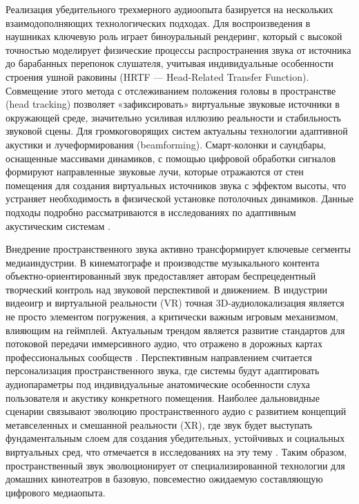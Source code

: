\documentclass{SibFU-docs}
\begin{document}

Реализация убедительного трехмерного аудиоопыта базируется на нескольких взаимодополняющих технологических подходах. Для воспроизведения в наушниках ключевую роль играет биноуральный рендеринг, который с высокой точностью моделирует физические процессы распространения звука от источника до барабанных перепонок слушателя, учитывая индивидуальные особенности строения ушной раковины (HRTF — Head-Related Transfer Function). Совмещение этого метода с отслеживанием положения головы в пространстве (head tracking) позволяет «зафиксировать» виртуальные звуковые источники в окружающей среде, значительно усиливая иллюзию реальности и стабильность звуковой сцены. Для громкоговорящих систем актуальны технологии адаптивной акустики и лучеформирования (beamforming). Смарт-колонки и саундбары, оснащенные массивами динамиков, с помощью цифровой обработки сигналов формируют направленные звуковые лучи, которые отражаются от стен помещения для создания виртуальных источников звука с эффектом высоты, что устраняет необходимость в физической установке потолочных динамиков. Данные подходы подробно рассматриваются в исследованиях по адаптивным акустическим системам \cite{ieee_adaptive_audio}.


Внедрение пространственного звука активно трансформирует ключевые сегменты медиаиндустрии. В кинематографе и производстве музыкального контента объектно-ориентированный звук предоставляет авторам беспрецедентный творческий контроль над звуковой перспективой и движением. В индустрии видеоигр и виртуальной реальности (VR) точная 3D-аудиолокализация является не просто элементом погружения, а критически важным игровым механизмом, влияющим на геймплей. Актуальным трендом является развитие стандартов для потоковой передачи иммерсивного аудио, что отражено в дорожных картах профессиональных сообществ \cite{aes_spatial_audio_roadmap}. Перспективным направлением считается персонализация пространственного звука, где системы будут адаптировать аудиопараметры под индивидуальные анатомические особенности слуха пользователя и акустику конкретного помещения. Наиболее дальновидные сценарии связывают эволюцию пространственного аудио с развитием концепций метавселенных и смешанной реальности (XR), где звук будет выступать фундаментальным слоем для создания убедительных, устойчивых и социальных виртуальных сред, что отмечается в исследованиях на эту тему \cite{meta_audio_arxiv}. Таким образом, пространственный звук эволюционирует от специализированной технологии для домашних кинотеатров в базовую, повсеместно ожидаемую составляющую цифрового медиаопыта.
\end{document}
